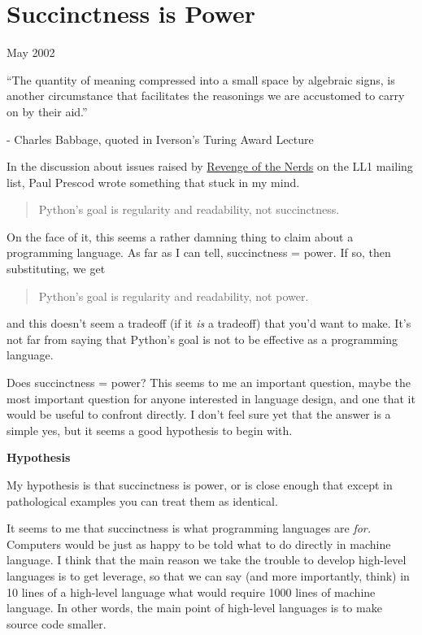 \chapter{Succinctness is Power}

May 2002

``The quantity of meaning compressed into a small space by algebraic
signs, is another circumstance that facilitates the reasonings we are
accustomed to carry on by their aid.''

- Charles Babbage, quoted in Iverson's Turing Award Lecture

In the discussion about issues raised by \href{icad.html}{Revenge of the
Nerds} on the LL1 mailing list, Paul Prescod wrote something that stuck
in my mind.

\begin{quote}
Python's goal is regularity and readability, not succinctness.
\end{quote}

On the face of it, this seems a rather damning thing to claim about a
programming language. As far as I can tell, succinctness = power. If so,
then substituting, we get

\begin{quote}
Python's goal is regularity and readability, not power.
\end{quote}

and this doesn't seem a tradeoff (if it \emph{is} a tradeoff) that you'd
want to make. It's not far from saying that Python's goal is not to be
effective as a programming language.

Does succinctness = power? This seems to me an important question, maybe
the most important question for anyone interested in language design,
and one that it would be useful to confront directly. I don't feel sure
yet that the answer is a simple yes, but it seems a good hypothesis to
begin with.

\textbf{Hypothesis}

My hypothesis is that succinctness is power, or is close enough that
except in pathological examples you can treat them as identical.

It seems to me that succinctness is what programming languages are
\emph{for.} Computers would be just as happy to be told what to do
directly in machine language. I think that the main reason we take the
trouble to develop high-level languages is to get leverage, so that we
can say (and more importantly, think) in 10 lines of a high-level
language what would require 1000 lines of machine language. In other
words, the main point of high-level languages is to make source code
smaller.

